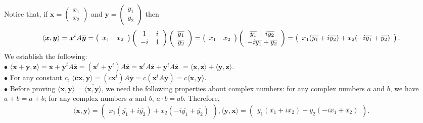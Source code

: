 \documentclass[11pt]{article}
\begin{document}
\begin{enumerate}
 Notice that, if $\bm{x}=\left(\begin{array}{c}x_1\\x_2\end{array}\right)$ and $\bm{y}=\left(\begin{array}{c}y_1\\y_2\end{array}\right)$ then 
\[\langle\bm{x}, \bm{y}\rangle=\bm{x}^tA\bm{\overline{y}}
=\left(\begin{array}{c c}x_1 & x_2\end{array}\right)
\left(\begin{array}{c c}1 & i\\-i & 1\end{array}\right)
\left(\begin{array}{c}\overline{y_1}\\\overline{y_2}\end{array}\right)
=\left(\begin{array}{c c}x_1 & x_2\end{array}\right)
\left(\begin{array}{c}\overline{y_1}+i\overline{y_2}\\ -i\overline{y_1}+\overline{y_2}\end{array}\right)
=\left(\begin{array}{c}x_1(\overline{y_1}+i\overline{y_2})+x_2(-i\overline{y_1}+\overline{y_2})\end{array}\right)
.\]
We establish the following:\\
$\bullet$ $\langle\bm{x+y}, \bm{z}\rangle = \bm{x+y}^tA\bm{\overline{z}}=(\bm{x}^t+\bm{y}^t)A\bm{\overline{z}}
=\bm{x}^tA\bm{\overline{z}}+\bm{y}^tA\bm{\overline{z}}$
$=\langle\bm{x}, \bm{z}\rangle+\langle\bm{y}, \bm{z}\rangle.$\\
$\bullet$ For any constant $c$, 
$\langle\bm{cx}, \bm{y}\rangle
=(c\bm{x}^t)A\bm{\overline{y}}
=c(\bm{x}^tA\bm{\overline{y}})
=c\langle\bm{x}, \bm{y}\rangle$. \\
$\bullet$ Before proving $\langle\bm{x}, \bm{y}\rangle=\overline{\langle\bm{x}, \bm{y}\rangle}$, we need the following properties about complex numbers: 
for any complex numbers $a$ and $b$, we have $\overline{a}+\overline{b}=\overline{a+b}$; for any complex numbers $a$ and $b$, $\overline{a}\cdot\overline{b}=\overline {ab}$. Therefore, 
\[\langle\bm{x}, \bm{y}\rangle=\left(\begin{array}{c}x_1(\overline{y_1}+i\overline{y_2})+x_2(-i\overline{y_1}+\overline{y_2})\end{array}\right), \langle\bm{y}, \bm{x}\rangle=\left(\begin{array}{c}y_1(\overline{x_1}+i\overline{x_2})+y_2(-i\overline{x_1}+\overline{x_2})\end{array}\right). \]

\end{enumerate}
\end{document}
